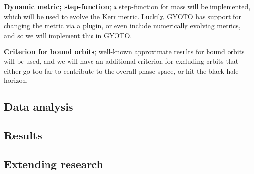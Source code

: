 \documentclass[a4paper,10pt]{article}
\begin{document}
\textbf{Dynamic metric; step-function}; a step-function for mass will be implemented, which will be used to evolve the Kerr metric. 
Luckily, GYOTO has support for changing the metric via a plugin, or even include numerically evolving metrics, and so we will 
implement this in GYOTO.

\textbf{Criterion for bound orbits}; well-known approximate results for bound orbits will be used, and we will have an additional criterion 
for excluding orbits that either go too far to contribute to the overall phase space, or hit the black hole horizon.



\subsection{Data analysis}


\subsection{Results}


\subsection{Extending research}

\end{document}
